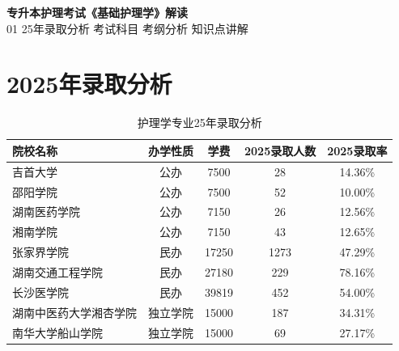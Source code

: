 \documentclass[11pt, a4paper]{ctexart}
\begin{document}
\begin{center}
    {\Huge \bfseries 专升本护理考试《基础护理学》解读} \\
    \vspace{0.3cm}
    {\large 01 25年录取分析  考试科目  考纲分析  知识点讲解}
\end{center}

\tableofcontents
\newpage

\section{2025年录取分析}
\begin{table}[htbp]
\centering
\caption{护理学专业25年录取分析}
\label{tab:admission}
\small
\begin{tabular}{|l|c|c|c|c|}
\hline
\textbf{院校名称} & \textbf{办学性质} & \textbf{学费} & \textbf{2025录取人数} & \textbf{2025录取率} \\
\hline
吉首大学 & 公办 & 7500 & 28 & 14.36\% \\
邵阳学院 & 公办 & 7500 & 52 & 10.00\% \\
湖南医药学院 & 公办 & 7150 & 26 & 12.56\% \\
湘南学院 & 公办 & 7150 & 43 & 12.65\% \\
张家界学院 & 民办 & 17250 & 1273 & 47.29\% \\
湖南交通工程学院 & 民办 & 27180 & 229 & 78.16\% \\
长沙医学院 & 民办 & 39819 & 452 & 54.00\% \\
湖南中医药大学湘杏学院 & 独立学院 & 15000 & 187 & 34.31\% \\
南华大学船山学院 & 独立学院 & 15000 & 69 & 27.17\% \\
\hline
\end{tabular}
\end{table}
\end{document}
